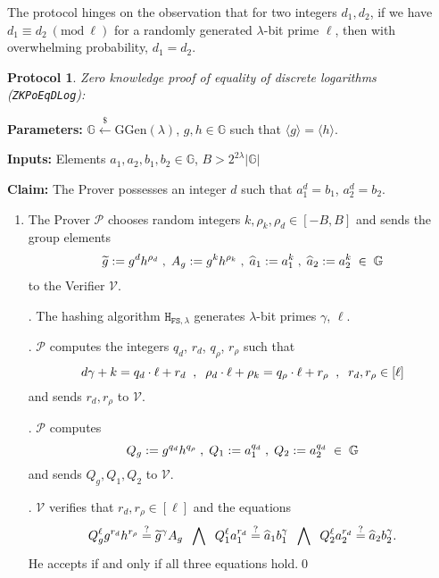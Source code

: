 \documentclass[11pt, lettersize, notitlepage, leqno, footskip=0.6cm]{article}
\newcommand{\ttt}{\texttt}
\newcommand{\bG}{\mathbb{G}}
\newcommand{\la}{\langle}
\newcommand{\ra}{\rangle}
\newcommand{\wti}{\widetilde}
\newcommand{\mc}{\mathcal}
\newcommand{\mb}{\mathbb}
\newcommand{\mr}{\mathrm}
\newcommand{\lam}{\lambda}
\newcommand{\lamb}{\lambda}
\newcommand{\what}{\widehat}
\newcommand{\mP}{\mc{P}}
\newcommand{\V}{\mc{V}}
\newcommand{\vs}{\vspace{-0.15cm}}
\newcommand{\noin}{\noindent}
\newcommand{\op}{overwhelming probability}
\newcommand{\sta}{\stackrel{?}{=}}
\newcommand{\Mod}[1]{\ (\mathrm{mod}\ #1)}
\newtheorem{Prot}[Thm]{Protocol}
\numberwithin{equation}{section}
\begin{document}
\noin The protocol hinges on the observation that for two integers $d_1,d_2$, if we have $d_1\equiv d_2\Mod{\ell}$ for a randomly generated $\lam$-bit prime $\ell$, then with \op, $d_1= d_2$.

\vspace{0.15cm}

\begin{Prot} \normalfont \hypertarget{EqDLog}{\textit{Zero knowledge proof of equality of discrete logarithms}} (\verb|ZKPoEqDLog|):\end{Prot} \vspace{-0.3cm}

\noin \textbf{Parameters:} $\mb{G}\xleftarrow{\$} \mr{GGen}(\lamb)$,  $g,h\in \mb{G}$ such that $\la g \ra = \la h \ra$.

\noin \textbf{Inputs:} Elements $a_1, a_2, b_1, b_2 \in \mb{G}$, $B > 2^{2\lam}|\bG|$

\noin \textbf{Claim:} The Prover possesses an integer $d$ such that $a_1^{d} = b_1$, $a_2^{d} = b_2$.

\begin{enumerate}[wide, labelwidth=!, labelindent=0pt]\vs \item The Prover $\mP$ chooses random integers $k, \rho_k, \rho_d\in [-B, B] $ and sends the group elements \vs $$\wti{g}:= g^d h^{\rho_d}\;,\; A_g:= g^k h^{\rho_k}\;,\; \what{a}_1:= a_1^{k}\;,\; \what{a}_2:= a_2^k \;\in\;\bG \vs $$ to the Verifier $\V$.

\noin 2. The hashing algorithm $\ttt{H}_{\ttt{FS},\lam}$ generates $\lam$-bit primes $\gamma$, $\ell$.

\noin 3. $\mP$ computes the integers $q_d$, $r_d$, $q_{\rho}$, $r_{\rho}$ such that \vs $$ d\gamma+k = q_d\cdot\ell+r_d\;\;,\;\;\rho_d\cdot \ell + \rho_k = q_{\rho}\cdot \ell + r_{\rho}\;\;,\;\; r_d,r_{\rho}\in[\ell]\vs $$ and sends $r_d,r_{\rho}$ to $\V$.

\noin 4. $\mP$ computes $$Q_g:= g^{q_{d}}h^{q_{\rho}}\;,\; Q_1:= a_1^{q_d}\;,\; Q_2:= a_2^{q_d}\;\in\;\bG \vs $$ and sends $Q_g, Q_1,Q_2$ to $\V$.

\noin 5. $\V$ verifies that $r_d,r_{\rho}\in [\ell]$ and the equations \vs $$Q_g^{\ell}g^{r_d}h^{r_{\rho}}  \sta \wti{g}^{\gamma}A_g\;\;\bigwedge\;\; Q_1^{\ell}a_1^{r_d}\sta \what{a}_1b_1^{\gamma}\;\;\bigwedge\;\; Q_2^{\ell}a_2^{r_d}\sta \what{a}_2b_2^{\gamma}. \vs $$ He accepts if and only if all three equations hold.\qed \end{enumerate}

\bigskip
\end{document}
